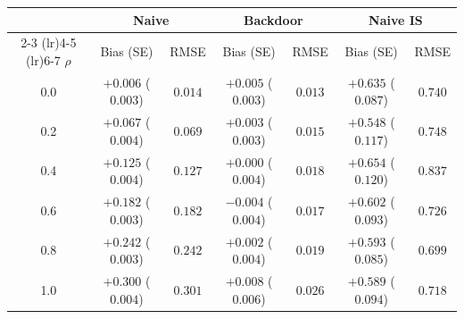 \begin{tabular}{ccccccc}
\toprule
& \multicolumn{2}{c}{Naive} & \multicolumn{2}{c}{Backdoor} & \multicolumn{2}{c}{Naive IS} \\
\cmidrule(lr){2-3} \cmidrule(lr){4-5} \cmidrule(lr){6-7}
$\rho$ & Bias (SE) & RMSE & Bias (SE) & RMSE & Bias (SE) & RMSE \\
\midrule
0.0 & $+0.006$ ($0.003$) & $0.014$ & $+0.005$ ($0.003$) & $0.013$ & $+0.635$ ($0.087$) & $0.740$ \\
0.2 & $+0.067$ ($0.004$) & $0.069$ & $+0.003$ ($0.003$) & $0.015$ & $+0.548$ ($0.117$) & $0.748$ \\
0.4 & $+0.125$ ($0.004$) & $0.127$ & $+0.000$ ($0.004$) & $0.018$ & $+0.654$ ($0.120$) & $0.837$ \\
0.6 & $+0.182$ ($0.003$) & $0.182$ & $-0.004$ ($0.004$) & $0.017$ & $+0.602$ ($0.093$) & $0.726$ \\
0.8 & $+0.242$ ($0.003$) & $0.242$ & $+0.002$ ($0.004$) & $0.019$ & $+0.593$ ($0.085$) & $0.699$ \\
1.0 & $+0.300$ ($0.004$) & $0.301$ & $+0.008$ ($0.006$) & $0.026$ & $+0.589$ ($0.094$) & $0.718$ \\
\bottomrule
\end{tabular}
